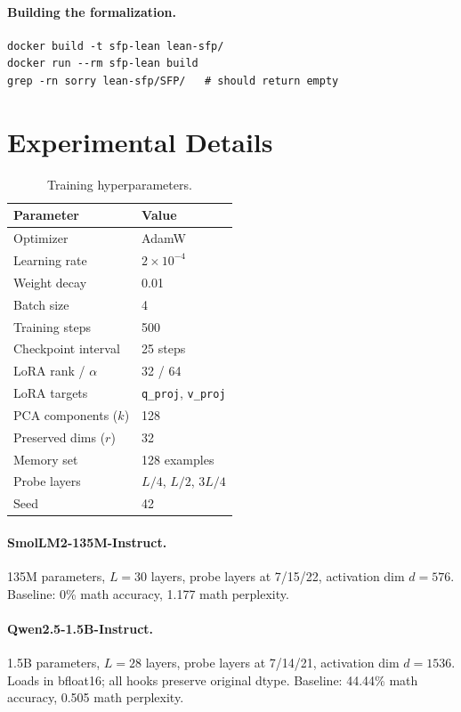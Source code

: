 \paragraph{Building the formalization.}
\begin{verbatim}
docker build -t sfp-lean lean-sfp/
docker run --rm sfp-lean build
grep -rn sorry lean-sfp/SFP/   # should return empty
\end{verbatim}

\section{Experimental Details}
\label{sec:exp_details}

\begin{table}[t]
\centering
\caption{Training hyperparameters.}
\label{tab:hyperparams}
\begin{tabular}{ll}
\toprule
Parameter & Value \\
\midrule
Optimizer & AdamW \\
Learning rate & $2 \times 10^{-4}$ \\
Weight decay & 0.01 \\
Batch size & 4 \\
Training steps & 500 \\
Checkpoint interval & 25 steps \\
LoRA rank / $\alpha$ & 32 / 64 \\
LoRA targets & \texttt{q\_proj}, \texttt{v\_proj} \\
PCA components ($k$) & 128 \\
Preserved dims ($r$) & 32 \\
Memory set & 128 examples \\
Probe layers & $L/4$, $L/2$, $3L/4$ \\
Seed & 42 \\
\bottomrule
\end{tabular}
\end{table}

\paragraph{SmolLM2-135M-Instruct.}
135M parameters, $L = 30$ layers, probe layers at 7/15/22, activation dim $d = 576$.
Baseline: 0\% math accuracy, 1.177 math perplexity.

\paragraph{Qwen2.5-1.5B-Instruct.}
1.5B parameters, $L = 28$ layers, probe layers at 7/14/21, activation dim $d = 1536$.
Loads in bfloat16; all hooks preserve original dtype.
Baseline: 44.44\% math accuracy, 0.505 math perplexity.

